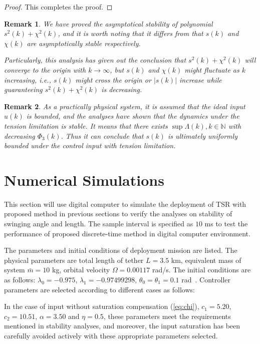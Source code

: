\documentclass[10pt,final,journal]{IEEEtran}
\newtheorem{myrem}{Remark}
\begin{document}
\begin{proof}
This completes the proof.\end{proof}
\begin{myrem}
	We have proved the asymptotical stability of polynomial $s^2(k)+\chi^2(k)$, and it is worth noting that it differs from that $s(k)$ and $\chi(k)$ are asymptotically stable respectively. 
	
	Particularly, this analysis has given out the conclusion that $s^2(k)+\chi^2(k)$ will converge to the origin with $k\to\infty$, but $s(k)$ and $\chi(k)$ might fluctuate as $k$ increasing, i.e., $s(k)$ might cross the origin or $\vert s(k)\vert$ increase while guaranteeing $s^2(k)+\chi^2(k)$ is decreasing. 
\end{myrem}
\begin{myrem}
	As a practically physical system, it is assumed that the ideal input $u(k)$ is bounded, and the analyses have shown that the dynamics under the tension limitation is stable. It means that there exists $\sup{\Lambda(k)},{k\in \mathbb{N}}$ with decreasing $\Phi_3(k)$. Thus it can conclude that $s(k)$ is ultimately uniformly bounded under the control input with tension limitation.
\end{myrem}

\section{Numerical Simulations}\label{sec:Numerical Simulations} 
This section will use digital computer to simulate the deployment of TSR with proposed method in previous sections to verify the analyses on stability of swinging angle and length. The sample interval is specified as $10$ ms to test the performance of proposed discrete-time method in digital computer environment. 

The parameters and initial conditions of deployment mission are listed. The physical parameters are total length of tether $L=3.5$  km, equivalent mass of system $\bar m=10$ kg, orbital velocity $\Omega = 0.00117$ rad/s. The initial conditions are as follows: $\lambda_0=-0.975$, $\lambda_1=-0.97499298$, $\theta_0=\theta_1=0.1$ rad~\cite{williams2008deployment}. Controller parameters are selected according to different cases as follows:

In the case of input without saturation compensation (\ref{eq:chi}), $c_1=5.20$, $c_2=10.51$, $\alpha=3.50$ and $\eta=0.5$, these parameters meet the requirements mentioned in stability analyses, and moreover, the input saturation has been carefully avoided actively with these appropriate parameters selected. 
\end{document}
